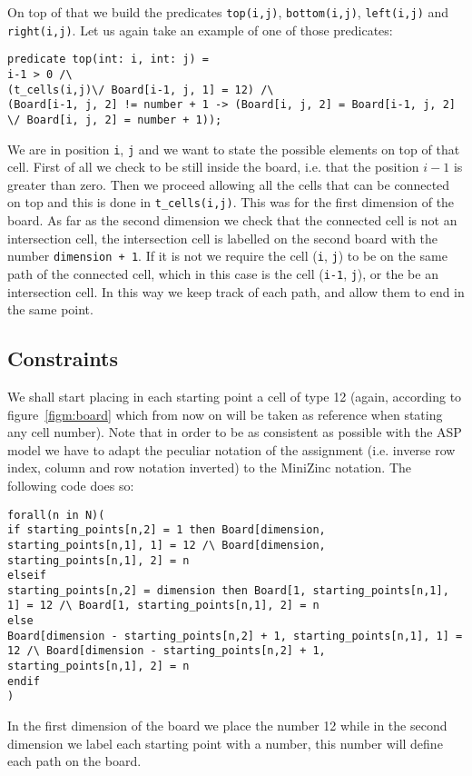 On top of that we build the predicates \texttt{top(i,j)}, \texttt{bottom(i,j)}, \texttt{left(i,j)} and \texttt{right(i,j)}.
Let us again take an example of one of those predicates:
\begin{verbatim}
predicate top(int: i, int: j) =
i-1 > 0 /\ 
(t_cells(i,j)\/ Board[i-1, j, 1] = 12) /\ 
(Board[i-1, j, 2] != number + 1 -> (Board[i, j, 2] = Board[i-1, j, 2]  \/ Board[i, j, 2] = number + 1));
\end{verbatim}
We are in position \texttt{i}, \texttt{j} and we want to state the possible elements on top of that cell. First of all we check to be still inside the board, i.e. that the position $i-1$ is greater than zero. Then we proceed allowing all the cells that can be connected on top and this is done in \texttt{t_cells(i,j)}. This was for the first dimension of the board. As far as the second dimension we check that the connected cell is not an intersection cell, the intersection cell is labelled on the second board with the number \texttt{dimension + 1}. If it is not we require the cell (\texttt{i}, \texttt{j}) to be on the same path of the connected cell, which in this case is the cell (\texttt{i-1}, \texttt{j}), or the be an intersection cell. In this way we keep track of each path, and allow them to end in the same point.

\subsection{Constraints}
We shall start placing in each starting point a cell of type 12 (again, according to figure~\ref{figm:board} which from now on will be taken as reference when stating any cell number). Note that in order to be as consistent as possible with the ASP model we have to adapt the peculiar notation of the assignment (i.e. inverse row index, column and row notation inverted) to the MiniZinc notation. The following code does so:

\begin{verbatim}
forall(n in N)(
if starting_points[n,2] = 1 then Board[dimension, starting_points[n,1], 1] = 12 /\ Board[dimension, starting_points[n,1], 2] = n
elseif
starting_points[n,2] = dimension then Board[1, starting_points[n,1], 1] = 12 /\ Board[1, starting_points[n,1], 2] = n
else
Board[dimension - starting_points[n,2] + 1, starting_points[n,1], 1] = 12 /\ Board[dimension - starting_points[n,2] + 1, starting_points[n,1], 2] = n
endif
)
\end{verbatim}
In the first dimension of the board we place the number 12 while in the second dimension we label each starting point with a number, this number will define each path on the board.

